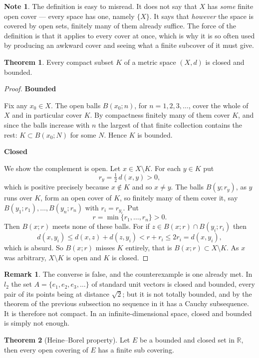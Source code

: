 \documentclass[11pt,a4paper]{article}
\theoremstyle{definition}
\newtheorem{thm}{Theorem}[section]
\newtheorem*{note}{Note}
\newtheorem*{remark}{Remark}
\newcommand{\subhead}[1]{%
  \par\medskip\noindent\textbf{#1}\par\nobreak\smallskip}
\begin{document}
\begin{note}
The definition is easy to misread. It does not say that $X$ has \emph{some}
finite open cover --- every space has one, namely $\{X\}$. It says that
\emph{however} the space is covered by open sets, finitely many of them already
suffice. The force of the definition is that it applies to every cover at once,
which is why it is so often used by producing an awkward cover and seeing what
a finite subcover of it must give.
\end{note}

\begin{thm}
Every compact subset $K$ of a metric space $(X,d)$ is closed and bounded.
\end{thm}

\begin{proof}
\subhead{Bounded}
Fix any $x_0\in X$. The open balls $B(x_0;n)$, for $n=1,2,3,\dots$, cover the
whole of $X$ and in particular cover $K$. By compactness finitely many of them
cover $K$, and since the balls increase with $n$ the largest of that finite
collection contains the rest: $K\subset B(x_0;N)$ for some $N$. Hence $K$ is
bounded.

\subhead{Closed}
We show the complement is open. Let $x\in X\setminus K$. For each $y\in K$ put
$$r_y = \tfrac12\, d(x,y) > 0 ,$$
which is positive precisely because $x\notin K$ and so $x \neq y$. The balls
$B(y;r_y)$, as $y$ runs over $K$, form an open cover of $K$, so finitely many
of them cover it, say $B(y_1;r_1),\dots,B(y_n;r_n)$ with $r_i = r_{y_i}$. Put
$$r = \min\{r_1,\dots,r_n\} > 0 .$$
Then $B(x;r)$ meets none of these balls. For if $z\in B(x;r)\cap B(y_i;r_i)$
then
$$d(x,y_i)\leq d(x,z)+d(z,y_i) < r + r_i \leq 2r_i = d(x,y_i),$$
which is absurd. So $B(x;r)$ misses $K$ entirely, that is
$B(x;r)\subset X\setminus K$. As $x$ was arbitrary, $X\setminus K$ is open and
$K$ is closed.
\end{proof}

\begin{remark}
The converse is false, and the counterexample is one already met. In $l_2$ the
set $A=\{e_1,e_2,e_3,\dots\}$ of standard unit vectors is closed and bounded,
every pair of its points being at distance $\sqrt2$; but it is not totally
bounded, and by the theorem of the previous subsection no sequence in it has a
Cauchy subsequence. It is therefore not compact. In an infinite-dimensional
space, closed and bounded is simply not enough.
\end{remark}

\begin{thm}[Heine--Borel property]
Let $E$ be a bounded and closed set in $\mathbb{R}$, then every open covering
of $E$ has a finite sub covering.
\end{thm}
\end{document}
